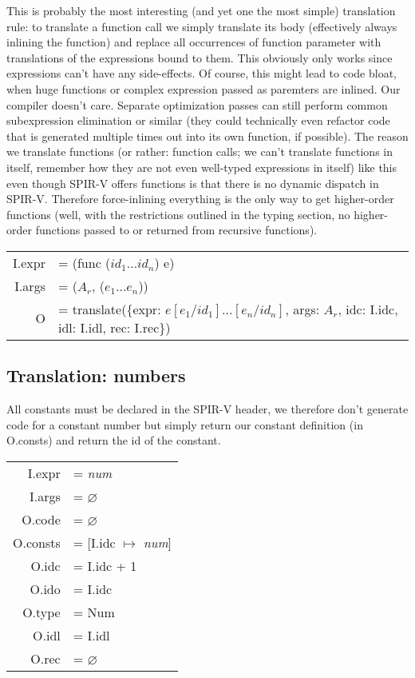 \documentclass[letterpaper,12pt]{article}
\begin{document}
This is probably the most interesting (and yet one the most simple) translation
rule: to translate a function call we simply translate its body
(effectively always inlining the function) and replace all occurrences of 
function parameter with translations of the expressions bound to them.
This obviously only works since expressions can't have any side-effects.
Of course, this might lead to code bloat, when huge functions or complex expression 
passed as paremters are inlined. Our compiler doesn't care.
Separate optimization passes can still perform common subexpression
elimination or similar (they could technically even refactor code that
is generated multiple times out into its own function, if possible).
The reason we translate functions (or rather: function calls; we can't translate
functions in itself, remember how they are not even well-typed expressions
in itself) like this even though SPIR-V offers functions is that
there is no dynamic dispatch in SPIR-V. Therefore force-inlining
everything is the only way to get higher-order functions (well, with
the restrictions outlined in the typing section, no higher-order functions
passed to or returned from recursive functions).

\medskip
\begin{tabularx}{\linewidth}{rl}
	I.expr &= (func ($id_1 \dots id_n$) e) \\
	I.args &= ($A_r$, ($e_1 \dots e_n$)) \\
	O &= translate(\{expr: $e[e_1 / id_1]\dots[e_n / id_n]$, args: $A_r$, idc: I.idc, idl: I.idl, rec: I.rec\}) \\
\end{tabularx}

\subsection{Translation: numbers}

All constants must be declared in the SPIR-V header, we therefore
don't generate code for a constant number but simply return our
constant definition (in O.consts) and return the id of the constant.

\begin{tabularx}{\linewidth}{rl}
	I.expr &= \textit{num} \\
	I.args &= $\varnothing$ \\
	O.code &= $\varnothing$ \\
	O.consts &= [I.idc $\mapsto$ \textit{num}] \\
	O.idc &= I.idc + 1 \\
	O.ido &= I.idc \\
	O.type &= Num \\
	O.idl &= I.idl \\
	O.rec &= $\varnothing$ \\
\end{tabularx}
\end{document}
